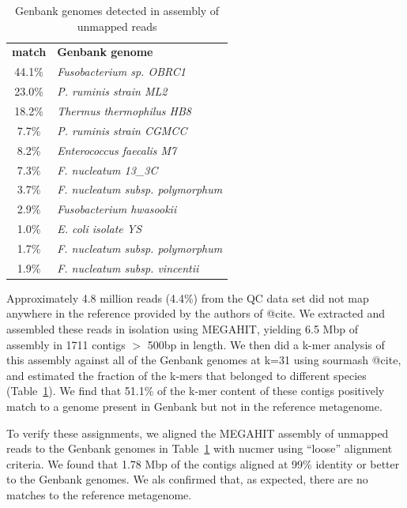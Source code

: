 \documentclass[11pt]{article}
\begin{document}


\begin{table}[t]
\caption{Genbank genomes detected in assembly of unmapped reads}
\centering
\begin{tabular}{|c|l|}
\hline

\textbf{match}& \textbf{Genbank genome} \\ [0.5ex] %
44.1\% & {\em \small Fusobacterium sp. OBRC1 } \\
\hline
23.0\% & {\em \small P. ruminis strain ML2 } \\
\hline
18.2\% & {\em \small Thermus thermophilus HB8 } \\
\hline
7.7\% & {\em \small P. ruminis strain CGMCC } \\
\hline
8.2\% & {\em \small Enterococcus faecalis M7 } \\
\hline
7.3\% & {\em \small F. nucleatum 13\_3C } \\
\hline
3.7\% & {\em \small F. nucleatum subsp. polymorphum } \\
\hline
2.9\% & {\em \small Fusobacterium hwasookii } \\
\hline
1.0\% & {\em \small E. coli isolate YS } \\
\hline
1.7\% & {\em \small F. nucleatum subsp. polymorphum } \\
\hline
1.9\% & {\em \small F. nucleatum subsp. vincentii } \\
\hline

\end{tabular}
\label{table:gather}
\end{table}

Approximately 4.8 million reads (4.4\%) from the QC data set did not
map anywhere in the reference provided by the authors of @cite.  We
extracted and assembled these reads in isolation using MEGAHIT,
yielding 6.5 Mbp of assembly in 1711 contigs $>$ 500bp in length.  We then did a k-mer
analysis of this assembly against all of the Genbank genomes at k=31
using sourmash @cite, and estimated the fraction of the k-mers that
belonged to different species (Table~\ref{table:gather}). We find that
51.1\% of the k-mer content of these contigs positively match to a genome
present in Genbank but not in the reference metagenome.

To verify these assignments, we aligned the MEGAHIT assembly of
unmapped reads to the Genbank genomes in Table~\ref{table:gather} with
nucmer using ``loose'' alignment criteria. We found that 1.78 Mbp of
the contigs aligned at 99\% identity or better to the Genbank genomes.
We als confirmed that, as expected, there are no matches to the
reference metagenome.
\end{document}
